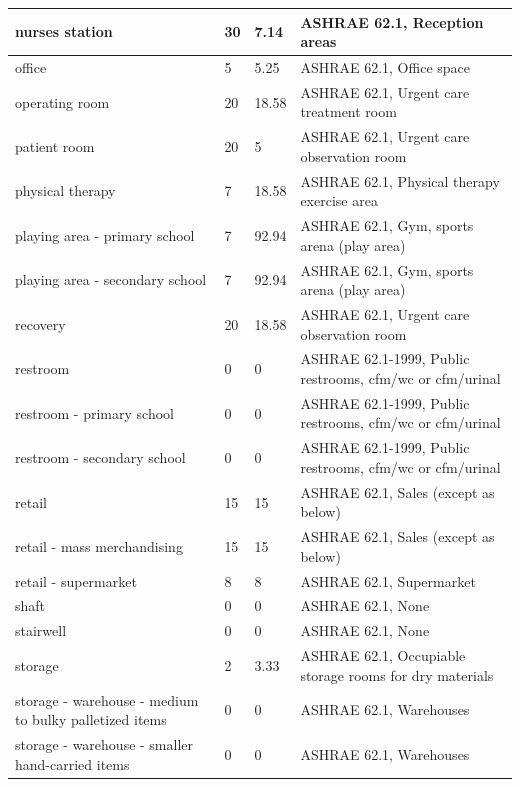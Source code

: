 \begin{center}
\begin{longtable}{|p{2.1in}|p{0.85in}|p{0.85in}|p{2.5in}|}
nurses station & 30 & 7.14 & ASHRAE 62.1, Reception areas \\ \hline
office & 5 & 5.25 & ASHRAE 62.1, Office space \\ \hline
operating room & 20 & 18.58 & ASHRAE 62.1, Urgent care treatment room \\ \hline
patient room & 20 & 5 & ASHRAE 62.1, Urgent care observation room \\ \hline
physical therapy & 7 & 18.58 & ASHRAE 62.1, Physical therapy exercise area \\ \hline
playing area - primary school & 7 & 92.94 & ASHRAE 62.1, Gym, sports arena (play area) \\ \hline
playing area - secondary school & 7 & 92.94 & ASHRAE 62.1, Gym, sports arena (play area) \\ \hline
recovery & 20 & 18.58 & ASHRAE 62.1, Urgent care observation room \\ \hline
restroom & 0 & 0 & ASHRAE 62.1-1999, Public restrooms, cfm/wc or cfm/urinal \\ \hline
restroom - primary school & 0 & 0 & ASHRAE 62.1-1999, Public restrooms, cfm/wc or cfm/urinal \\ \hline
restroom - secondary school & 0 & 0 & ASHRAE 62.1-1999, Public restrooms, cfm/wc or cfm/urinal \\ \hline
retail & 15 & 15 & ASHRAE 62.1, Sales (except as below) \\ \hline
retail - mass merchandising & 15 & 15 & ASHRAE 62.1, Sales (except as below) \\ \hline
retail - supermarket & 8 & 8 & ASHRAE 62.1, Supermarket \\ \hline
shaft & 0 & 0 & ASHRAE 62.1, None \\ \hline
stairwell & 0 & 0 & ASHRAE 62.1, None \\ \hline
storage & 2 & 3.33 & ASHRAE 62.1, Occupiable storage rooms for dry materials \\ \hline
storage - warehouse - medium to bulky palletized items & 0 & 0 & ASHRAE 62.1, Warehouses \\ \hline
storage - warehouse - smaller hand-carried items & 0 & 0 & ASHRAE 62.1, Warehouses \\ \hline
\end{longtable}
\end{center}
